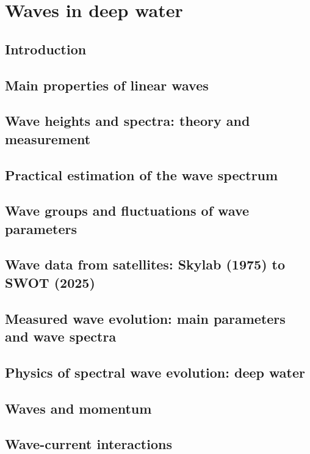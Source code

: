 \documentclass[a4paper]{book}  %
\begin{document}
\part{Waves in deep water} 
\cleardoublepage
\chapter{Introduction}\label{ch1}

\cleardoublepage
\chapter{Main properties of linear waves}\label{ch1b}

\cleardoublepage
\chapter{Wave heights and spectra: theory and measurement}\label{ch2}

\cleardoublepage
\chapter{Practical estimation of the wave spectrum}\label{ch_anaspec}

\cleardoublepage
\chapter{Wave groups and fluctuations of wave parameters}\label{ch_groups}

\cleardoublepage
\chapter{Wave data from satellites: Skylab (1975) to SWOT (2025)}\label{ch_sat}

\cleardoublepage
\chapter{Measured wave evolution: main parameters and wave spectra}\label{ch3}

\cleardoublepage
\chapter{Physics of spectral wave evolution: deep water}\label{ch_sourceterms}

\cleardoublepage
\chapter{Waves and momentum}\label{ch_momentum}

\cleardoublepage
\chapter{Wave-current interactions}\label{ch_current}

\cleardoublepage
\end{document}
